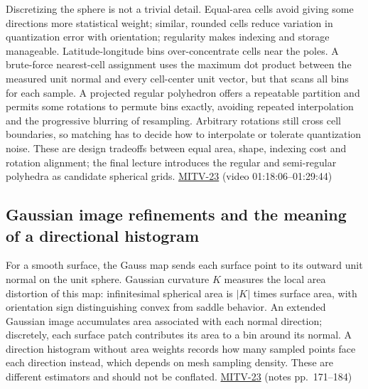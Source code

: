 Discretizing the sphere is not a trivial detail. Equal-area cells avoid giving some directions more statistical weight; similar, rounded cells reduce variation in quantization error with orientation; regularity makes indexing and storage manageable. Latitude-longitude bins over-concentrate cells near the poles. A brute-force nearest-cell assignment uses the maximum dot product between the measured unit normal and every cell-center unit vector, but that scans all bins for each sample. A projected regular polyhedron offers a repeatable partition and permits some rotations to permute bins exactly, avoiding repeated interpolation and the progressive blurring of resampling. Arbitrary rotations still cross cell boundaries, so matching has to decide how to interpolate or tolerate quantization noise. These are design tradeoffs between equal area, shape, indexing cost and rotation alignment; the final lecture introduces the regular and semi-regular polyhedra as candidate spherical grids. \hyperref[04-visual-computing-ii-ch036-mitv-23---gaussian-image-solids-of-revolution-direction-histograms-regular-polyhedra]{MITV-23} (video 01:18:06--01:29:44)

\subsection{Gaussian image refinements and the meaning of a directional histogram}\label{04-visual-computing-ii-ch032-gaussian-image-refinements-and-the-meaning-of-a-directional-histogram}

\hypertarget{04-visual-computing-ii-ch032-gaussian-image-refinements-and-the-meaning-of-a-directional-histogram}{}

For a smooth surface, the Gauss map sends each surface point to its outward unit normal on the unit sphere. Gaussian curvature \(K\) measures the local area distortion of this map: infinitesimal spherical area is \(|K|\) times surface area, with orientation sign distinguishing convex from saddle behavior. An extended Gaussian image accumulates area associated with each normal direction; discretely, each surface patch contributes its area to a bin around its normal. A direction histogram without area weights records how many sampled points face each direction instead, which depends on mesh sampling density. These are different estimators and should not be conflated. \hyperref[04-visual-computing-ii-ch036-mitv-23---gaussian-image-solids-of-revolution-direction-histograms-regular-polyhedra]{MITV-23} (notes pp.~171--184)


